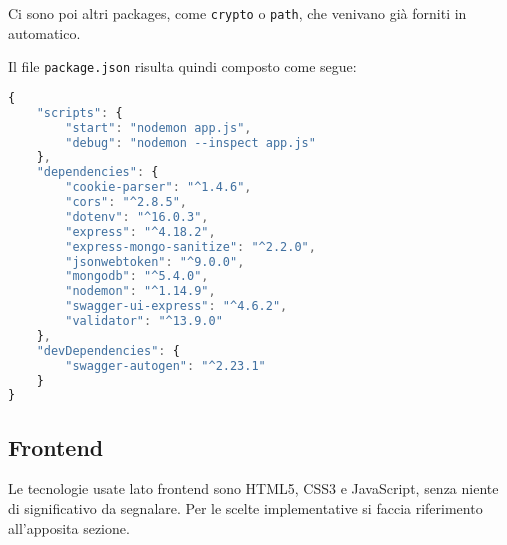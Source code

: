 Ci sono poi altri packages, come \verb|crypto| o \verb|path|, che venivano già forniti in automatico.

Il file \verb|package.json| risulta quindi composto come segue:
\begin{lstlisting}[language=JavaScript]
{
    "scripts": {
        "start": "nodemon app.js",
        "debug": "nodemon --inspect app.js"
    },
    "dependencies": {
        "cookie-parser": "^1.4.6",
        "cors": "^2.8.5",
        "dotenv": "^16.0.3",
        "express": "^4.18.2",
        "express-mongo-sanitize": "^2.2.0",
        "jsonwebtoken": "^9.0.0",
        "mongodb": "^5.4.0",
        "nodemon": "^1.14.9",
        "swagger-ui-express": "^4.6.2",
        "validator": "^13.9.0"
    },
    "devDependencies": {
        "swagger-autogen": "^2.23.1"
    }
}
\end{lstlisting}
\subsection{Frontend}
Le tecnologie usate lato frontend sono HTML5, CSS3 e JavaScript, senza niente di significativo da segnalare. Per le scelte implementative si faccia riferimento all'apposita sezione.
\newpage